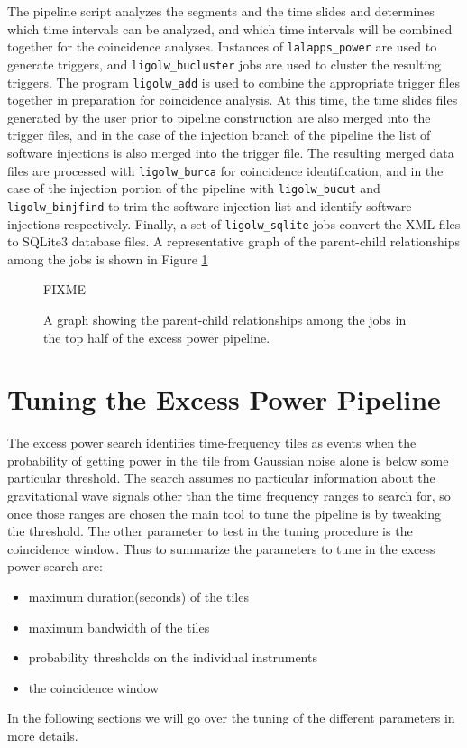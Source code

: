 \documentclass[10pt]{article}
\newcommand{\prog}[1]{\texttt{#1}}
\begin{document}
The pipeline script analyzes the segments and the time slides and
determines which time intervals can be analyzed, and which time intervals
will be combined together for the coincidence analyses.  Instances of
\prog{lalapps\_power} are used to generate triggers, and
\prog{ligolw\_bucluster} jobs are used to cluster the resulting triggers.
The program \prog{ligolw\_add} is used to combine the appropriate trigger
files together in preparation for coincidence analysis.  At this time, the
time slides files generated by the user prior to pipeline construction are
also merged into the trigger files, and in the case of the injection branch
of the pipeline the list of software injections is also merged into the
trigger file.  The resulting merged data files are processed with
\prog{ligolw\_burca} for coincidence identification, and in the case of the
injection portion of the pipeline with \prog{ligolw\_bucut} and
\prog{ligolw\_binjfind} to trim the software injection list and identify
software injections respectively.  Finally, a set of \prog{ligolw\_sqlite}
jobs convert the XML files to SQLite3 database files.  A representative
graph of the parent-child relationships among the jobs is shown in Figure
\ref{fig4}
\begin{figure}
\begin{center}
FIXME
\end{center}
\caption{A graph showing the parent-child relationships among the jobs in
the top half of the excess power pipeline.}
\label{fig4}
\end{figure}


\section{Tuning the Excess Power Pipeline}


The excess power search identifies time-frequency tiles as events when the 
probability of getting power in the tile from Gaussian noise alone
is below some particular threshold.  The search assumes no particular 
information about the gravitational wave signals other than the time
frequency ranges to search for,  so once those ranges are chosen the main 
tool to tune the pipeline is by tweaking the threshold.  The other parameter 
to test in the tuning procedure is the coincidence window.  Thus to 
summarize the parameters to tune in the excess power search are:
\begin{itemize}
\item maximum duration(seconds) of the tiles
\item maximum bandwidth of the tiles
\item probability thresholds on the individual instruments
\item the coincidence window
\end{itemize}
In the following sections we will go over the tuning of the different 
parameters in more details.
\end{document}
